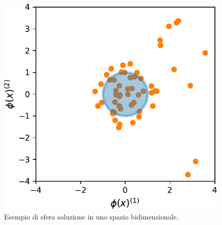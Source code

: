 \documentclass [11pt,a4paper,twoside,openright] {book}
\begin{document}
\begin{figure}
\centering
\includegraphics[scale=.65]{figure/fuzzification11.pdf}
\caption{Esempio di sfera soluzione in uno spazio bidimensionale.\label{fuzzification11}}
\end{figure}
\end{document}
